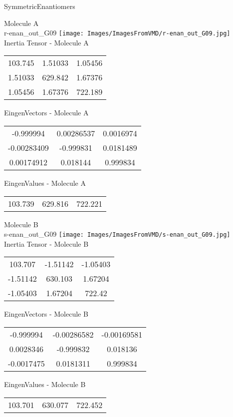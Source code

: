 \vtab[-2cm]
\begin{center}
{\large SymmetricEnantiomers}
\end{center}
\begin{multicols}{2}
\begin{center}
Molecule A \\ 
r-enan\_out\_G09
\texttt{[image: Images/ImagesFromVMD/r-enan\_out\_G09.jpg]}
\\
Inertia Tensor - Molecule A \\
\vtab
\begin{tabular}{|c c c|}
103.745	 & 	1.51033	 & 	1.05456	 \\
1.51033	 & 	629.842	 & 	1.67376	 \\
1.05456	 & 	1.67376	 & 	722.189
\end{tabular}

\vtab
 EingenVectors - Molecule A     \\
\vtab
\begin{tabular}{|c c c|}
-0.999994	 & 	0.00286537	 & 	0.0016974	 \\
-0.00283409	 & 	-0.999831	 & 	0.0181489	 \\
0.00174912	 & 	0.018144	 & 	0.999834
\end{tabular}

\vtab
 EingenValues - Molecule A     \\
\vtab
\begin{tabular}{|c c c|}
103.739	 & 	629.816	 & 	722.221
\end{tabular}
\columnbreak

Molecule B \\ 
s-enan\_out\_G09
\texttt{[image: Images/ImagesFromVMD/s-enan\_out\_G09.jpg]}
\\
Inertia Tensor - Molecule B \\
\vtab
\begin{tabular}{|c c c|}
103.707	 & 	-1.51142	 & 	-1.05403	 \\
-1.51142	 & 	630.103	 & 	1.67204	 \\
-1.05403	 & 	1.67204	 & 	722.42
\end{tabular}

\vtab
 EingenVectors - Molecule B     \\
\vtab
\begin{tabular}{|c c c|}
-0.999994	 & 	-0.00286582	 & 	-0.00169581	 \\
0.0028346	 & 	-0.999832	 & 	0.018136	 \\
-0.0017475	 & 	0.0181311	 & 	0.999834
\end{tabular}

\vtab
 EingenValues - Molecule B     \\
\vtab
\begin{tabular}{|c c c|}
103.701	 & 	630.077	 & 	722.452
\end{tabular}

\end{center}
\end{multicols}
